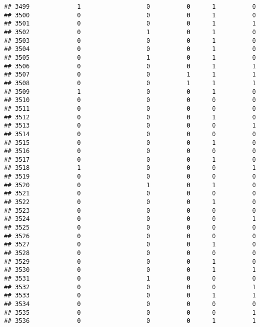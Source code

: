 \documentclass[
]{article}
\begin{document}
\begin{verbatim}
## 3499             1                  0          0      1          0
## 3500             0                  0          0      1          0
## 3501             0                  0          0      1          1
## 3502             0                  1          0      1          0
## 3503             0                  0          0      1          0
## 3504             0                  0          0      1          0
## 3505             0                  1          0      1          0
## 3506             0                  0          0      1          1
## 3507             0                  0          1      1          1
## 3508             0                  0          1      1          1
## 3509             1                  0          0      1          0
## 3510             0                  0          0      0          0
## 3511             0                  0          0      0          0
## 3512             0                  0          0      1          0
## 3513             0                  0          0      0          1
## 3514             0                  0          0      0          0
## 3515             0                  0          0      1          0
## 3516             0                  0          0      0          0
## 3517             0                  0          0      1          0
## 3518             1                  0          0      0          1
## 3519             0                  0          0      0          0
## 3520             0                  1          0      1          0
## 3521             0                  0          0      0          0
## 3522             0                  0          0      1          0
## 3523             0                  0          0      0          0
## 3524             0                  0          0      0          1
## 3525             0                  0          0      0          0
## 3526             0                  0          0      0          0
## 3527             0                  0          0      1          0
## 3528             0                  0          0      0          0
## 3529             0                  0          0      1          0
## 3530             0                  0          0      1          1
## 3531             0                  1          0      0          0
## 3532             0                  0          0      0          1
## 3533             0                  0          0      1          1
## 3534             0                  0          0      0          0
## 3535             0                  0          0      0          1
## 3536             0                  0          0      1          1

\end{verbatim}
\end{document}
